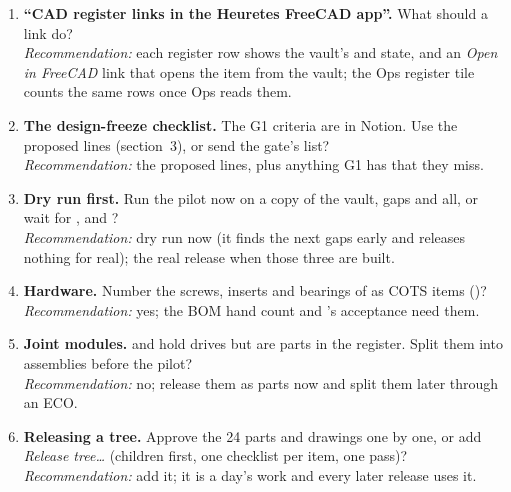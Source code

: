 \begin{enumerate}
        never issues a blocked one. For items it holds, the vault writes state and revision back as a diff you commit;
        Notion mirrors the CSV.
  \item \textbf{``CAD register links in the Heuretes FreeCAD app''.} What should a link do?\\
        \emph{Recommendation:} each register row shows the vault's  and state, and an \emph{Open in
        FreeCAD} link that opens the item from the vault; the Ops register tile counts the same rows once Ops reads them.
  \item \textbf{The design-freeze checklist.} The G1 criteria are in Notion. Use the proposed lines (section~3), or send
        the gate's list?\\
        \emph{Recommendation:} the proposed lines, plus anything G1 has that they miss.
  \item \textbf{Dry run first.} Run the pilot now on a copy of the vault, gaps and all, or wait for ,
         and ?\\
        \emph{Recommendation:} dry run now (it finds the next gaps early and releases nothing for real); the real
        release when those three are built.
  \item \textbf{Hardware.} Number the screws, inserts and bearings of  as COTS items ()?\\
        \emph{Recommendation:} yes; the BOM hand count and 's acceptance need them.
  \item \textbf{Joint modules.}  and  hold drives but are parts in the register. Split them
        into  assemblies before the pilot?\\
        \emph{Recommendation:} no; release them as parts now and split them later through an ECO.
  \item \textbf{Releasing a tree.} Approve the 24 parts and drawings one by one, or add \emph{Release tree\ldots}
        (children first, one checklist per item, one pass)?\\
        \emph{Recommendation:} add it; it is a day's work and every later release uses it.
\end{enumerate}
